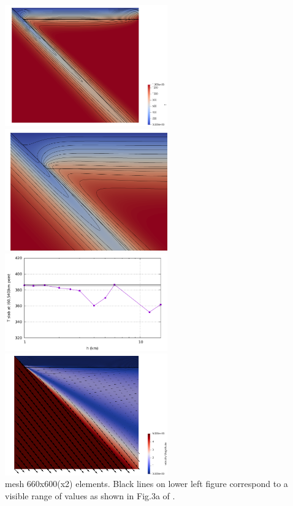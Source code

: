 \begin{center}
\includegraphics[width=7cm]{python_codes/fieldstone_45/images/temp}
\includegraphics[width=7cm]{python_codes/fieldstone_45/images/temp_zoom}\\
\includegraphics[width=7cm]{python_codes/fieldstone_45/images/T60.pdf}
\includegraphics[width=7cm]{python_codes/fieldstone_45/images/vel}\\
{\small mesh 660x600(x2) elements. Black lines on lower left figure 
correspond to a visible range of values as shown in Fig.3a of \cite{vack08}.}
\end{center}

